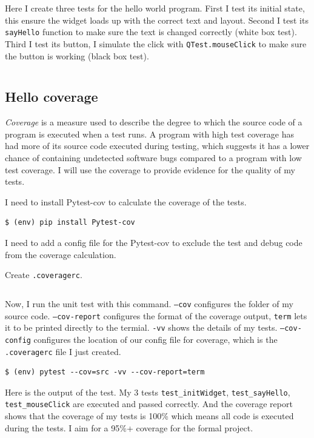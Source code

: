 \documentclass[a4paper]{report}
\begin{document}
Here I create three tests for the hello world program. First I test its initial state, this ensure the widget loads up with the correct text and layout. Second I test its \texttt{sayHello} function to make sure the text is changed correctly (white box test). Third I test its button, I simulate the click with \texttt{QTest.mouseClick} to make sure the button is working (black box test).

\inputminted{python}{../tests/test_helloworld.py}

\subsection{Hello coverage}

\emph{Coverage} is a measure used to describe the degree to which the source code of a program is executed when a test runs. A program with high test coverage has had more of its source code executed during testing, which suggests it has a lower chance of containing undetected software bugs compared to a program with low test coverage. I will use the coverage to provide evidence for the quality of my tests.

I need to install Pytest-cov to calculate the coverage of the tests.

\begin{verbatim}
$ (env) pip install Pytest-cov
\end{verbatim}

I need to add a config file for the Pytest-cov to exclude the test and debug code from the coverage calculation.

Create \texttt{.coveragerc}.

\inputminted{text}{../.coveragerc}

Now, I run the unit test with this command. \texttt{--cov} configures the folder of my source code. \texttt{--cov-report} configures the format of the coverage output, \texttt{term} lets it to be printed directly to the termial. \texttt{-vv} shows the details of my tests. \texttt{--cov-config} configures the location of our config file for coverage, which is the \texttt{.coveragerc} file I just created.

\begin{verbatim}
$ (env) pytest --cov=src -vv --cov-report=term
\end{verbatim}

Here is the output of the test. My 3 tests \texttt{test_initWidget}, \texttt{test_sayHello}, \texttt{test_mouseClick} are executed and passed correctly. And the coverage report shows that the coverage of my tests is 100\% which means all code is executed during the tests. I aim for a 95\%+ coverage for the formal project.
\end{document}
